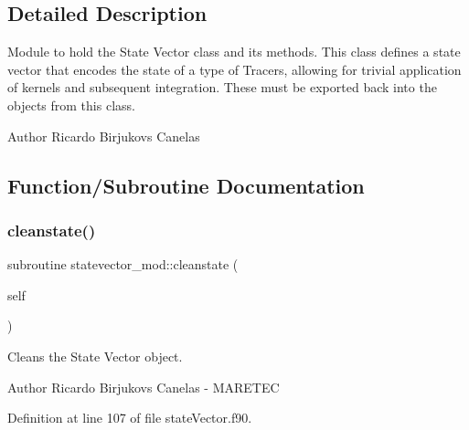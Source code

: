 \subsection{Detailed Description}
Module to hold the State Vector class and its methods. This class defines a state vector that encodes the state of a type of Tracers, allowing for trivial application of kernels and subsequent integration. These must be exported back into the objects from this class. 

\begin{DoxyAuthor}{Author}
Ricardo Birjukovs Canelas 
\end{DoxyAuthor}


\subsection{Function/\+Subroutine Documentation}
\mbox{\label{namespacestatevector__mod_acb2d2a7c4c5ee5d86a601be7db58c1df}} 
\subsubsection{\texorpdfstring{cleanstate()}{cleanstate()}}
{\footnotesize\ttfamily subroutine statevector\+\_\+mod\+::cleanstate (\begin{DoxyParamCaption}\item[{class(\mbox{\hyperlink{structstatevector__mod_1_1statevector__class}{statevector\+\_\+class}}), intent(inout)}]{self }\end{DoxyParamCaption})\hspace{0.3cm}{\ttfamily [private]}}



Cleans the State Vector object. 

\begin{DoxyAuthor}{Author}
Ricardo Birjukovs Canelas -\/ M\+A\+R\+E\+T\+EC 
\end{DoxyAuthor}


Definition at line 107 of file state\+Vector.\+f90.


